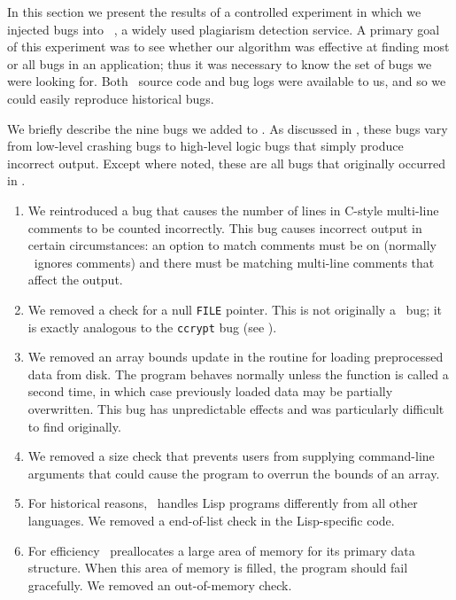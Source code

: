 
In this section we present the results of a controlled experiment in
which we injected bugs into \moss\ \cite{Schleimer:2003:WLA}, a widely
used plagiarism detection service.  A primary goal of this experiment
was to see whether our algorithm was effective at finding most or all
bugs in an application; thus it was necessary to know the set of bugs
we were looking for.  Both \moss\ source code and bug logs were
available to us, and so we could easily reproduce historical bugs.

We briefly describe the nine bugs we added to \moss.  As discussed in
, these bugs vary from low-level crashing
bugs to high-level logic bugs that simply produce incorrect output.
Except where noted, these are all bugs that originally occurred in
\moss.
\begin{enumerate}
\item We reintroduced a bug that causes the number of
lines in C-style multi-line comments to be counted incorrectly.  This bug causes incorrect output
in certain circumstances: an option to
match comments must be on (normally \moss\ ignores comments)
and there must be matching multi-line comments that affect the output.

\item We removed a check for a
null {\tt FILE} pointer.  This is not originally a \moss\ bug; it is exactly analogous to the {\tt ccrypt} bug (see ).

\item We removed an array bounds update
in the routine for loading preprocessed data from disk. The
program behaves normally unless the function is called a second time,
in which case previously loaded data may be partially overwritten.
This bug has unpredictable effects and
was particularly difficult to find originally.

\item We removed a size check that prevents users from supplying command-line arguments
that could cause the program to overrun the bounds of an array.

\item For historical reasons, \moss\ handles Lisp programs differently
from all other languages.  We removed a end-of-list check in the Lisp-specific
code.

\item For efficiency \moss\ preallocates a large area of memory for its primary data structure.
When this area of memory is filled, the program should fail
gracefully.  We removed an out-of-memory check. 


\end{enumerate}
